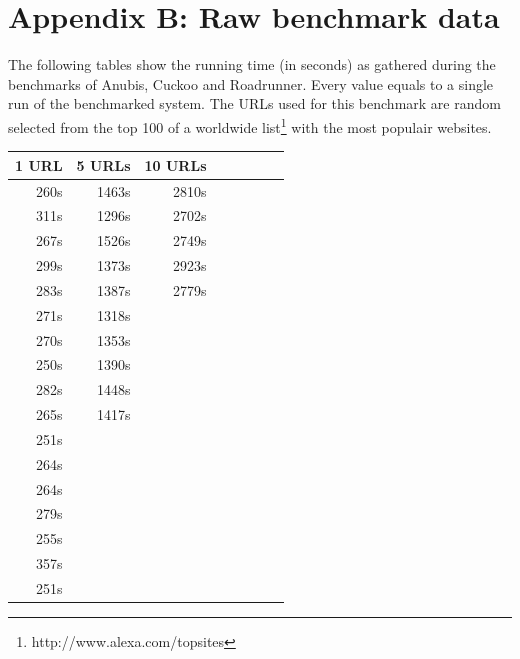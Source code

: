 \documentclass{scrartcl}
\begin{document}
\clearpage

\section*{Appendix B: Raw benchmark data}

The following tables show the running time (in seconds) as gathered during the benchmarks of Anubis, Cuckoo and Roadrunner. Every value equals to a single run of the benchmarked system. The URLs used for this benchmark are random selected from the top 100 of a worldwide list\footnote{http://www.alexa.com/topsites} with the most populair websites.

\begin{table}[h]
\center
\begin{tabular}{@{}llllllll@{}}
\toprule
1 URL       & 5 URLs      & 10 URLs    \\ \midrule
\multicolumn{1}{r}{260s} & \multicolumn{1}{r}{1463s} & \multicolumn{1}{r}{2810s} \\
\multicolumn{1}{r}{311s} & \multicolumn{1}{r}{1296s} & \multicolumn{1}{r}{2702s} \\
\multicolumn{1}{r}{267s} & \multicolumn{1}{r}{1526s} & \multicolumn{1}{r}{2749s} \\
\multicolumn{1}{r}{299s} & \multicolumn{1}{r}{1373s} & \multicolumn{1}{r}{2923s} \\
\multicolumn{1}{r}{283s} & \multicolumn{1}{r}{1387s} & \multicolumn{1}{r}{2779s} \\
\multicolumn{1}{r}{271s} & \multicolumn{1}{r}{1318s} & \\
\multicolumn{1}{r}{270s} & \multicolumn{1}{r}{1353s} & \\
\multicolumn{1}{r}{250s} & \multicolumn{1}{r}{1390s} & \\
\multicolumn{1}{r}{282s} & \multicolumn{1}{r}{1448s} & \\
\multicolumn{1}{r}{265s} & \multicolumn{1}{r}{1417s} & \\
\multicolumn{1}{r}{251s} &  & \\
\multicolumn{1}{r}{264s} &  & \\
\multicolumn{1}{r}{264s} &  & \\
\multicolumn{1}{r}{279s} &  & \\
\multicolumn{1}{r}{255s} &  & \\
\multicolumn{1}{r}{357s} &  & \\
\multicolumn{1}{r}{251s} &  & \\

\end{tabular}
\end{table}
\end{document}
